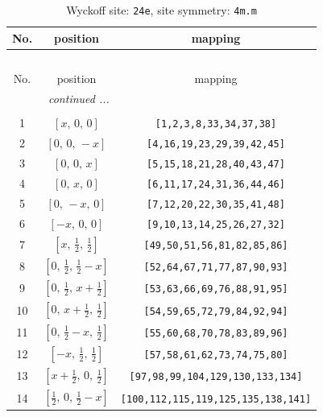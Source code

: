 \documentclass[fleqn,8pt]{jsarticle}
\begin{document}
\begin{longtable}{ccc}
\caption{Wyckoff site: {\tt 24e}, site symmetry: {\tt 4m.m}}
 \\
 \hline \hline
No. & position & mapping \\ \hline \endfirsthead

\multicolumn{2}{l}{\tablename\ \thetable{}} \\
 \hline \hline
No. & position & mapping \\ \hline \endhead

 \hline \hline
\multicolumn{2}{r}{\footnotesize\it continued ...} \\ \endfoot

 \hline \hline
\multicolumn{2}{r}{} \\ \endlastfoot

1 & $\left[ x,\, 0,\, 0 \right]$ & {\tt [1,2,3,8,33,34,37,38]} \\ \hline
2 & $\left[ 0,\, 0,\, - x \right]$ & {\tt [4,16,19,23,29,39,42,45]} \\ \hline
3 & $\left[ 0,\, 0,\, x \right]$ & {\tt [5,15,18,21,28,40,43,47]} \\ \hline
4 & $\left[ 0,\, x,\, 0 \right]$ & {\tt [6,11,17,24,31,36,44,46]} \\ \hline
5 & $\left[ 0,\, - x,\, 0 \right]$ & {\tt [7,12,20,22,30,35,41,48]} \\ \hline
6 & $\left[ - x,\, 0,\, 0 \right]$ & {\tt [9,10,13,14,25,26,27,32]} \\ \hline
7 & $\left[ x,\, \frac{1}{2},\, \frac{1}{2} \right]$ & {\tt [49,50,51,56,81,82,85,86]} \\ \hline
8 & $\left[ 0,\, \frac{1}{2},\, \frac{1}{2} - x \right]$ & {\tt [52,64,67,71,77,87,90,93]} \\ \hline
9 & $\left[ 0,\, \frac{1}{2},\, x + \frac{1}{2} \right]$ & {\tt [53,63,66,69,76,88,91,95]} \\ \hline
10 & $\left[ 0,\, x + \frac{1}{2},\, \frac{1}{2} \right]$ & {\tt [54,59,65,72,79,84,92,94]} \\ \hline
11 & $\left[ 0,\, \frac{1}{2} - x,\, \frac{1}{2} \right]$ & {\tt [55,60,68,70,78,83,89,96]} \\ \hline
12 & $\left[ - x,\, \frac{1}{2},\, \frac{1}{2} \right]$ & {\tt [57,58,61,62,73,74,75,80]} \\ \hline
13 & $\left[ x + \frac{1}{2},\, 0,\, \frac{1}{2} \right]$ & {\tt [97,98,99,104,129,130,133,134]} \\ \hline
14 & $\left[ \frac{1}{2},\, 0,\, \frac{1}{2} - x \right]$ & {\tt [100,112,115,119,125,135,138,141]} \\ \hline

\end{longtable}
\end{document}
